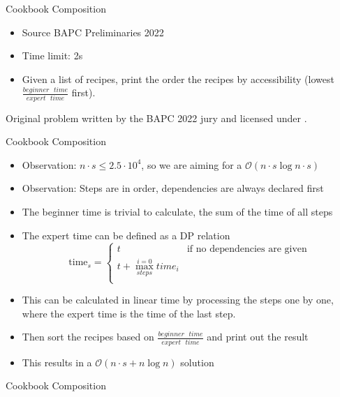 \documentclass[11pt,pdf, aspectratio=169]{beamer}
\begin{document}
  \begin{frame}{Cookbook Composition}
    \begin{itemize}
      \item Source BAPC Preliminaries 2022
      \item Time limit: 2s
      \item Given a list of recipes, print the order the recipes by accessibility (lowest $\frac{beginner\text{ }time}{expert\text{ }time}$ first).

    \end{itemize}
    Original problem written by the BAPC 2022 jury and licensed under \doclicenseLongNameRef.

    \doclicenseImage
  \end{frame}

  \begin{frame}{Cookbook Composition}
    \begin{itemize}
      \item<+-> Observation: $n\cdot s \leq 2.5\cdot10^4$, so we are aiming for a $\mathcal{O}(n\cdot s \log{n\cdot s})$
      \item<+-> Observation: Steps are in order, dependencies are always declared first
      \item<+-> The beginner time is trivial to calculate, the sum of the time of all steps
      \item<+-> The expert time can be defined as a DP relation\\
      \[\text{time}_s = \begin{cases}
                          t & \text{if no dependencies are given}\\
                          t + \max\limits_{steps}^{i=0} time_i & \\
      \end{cases}\]
      \item<+-> This can be calculated in linear time by processing the steps one by one, where the expert time is the time of the last step.
      \item<+-> Then sort the recipes based on $\frac{beginner\text{ }time}{expert\text{ }time}$ and print out the result
      \item<+-> This results in a $\mathcal{O}(n\cdot s + n \log n)$ solution
    \end{itemize}
  \end{frame}
  \begin{frame}[containsverbatim]{Cookbook Composition}
    \inputminted[fontsize=\tiny]{python}{code/session-4/dapc-c.py}
  \end{frame}
\end{document}
